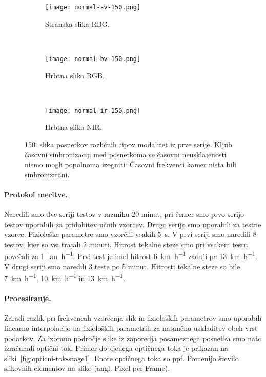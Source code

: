 \begin{figure}[htb]
	\centering
	\begin{subfigure}[t]{0.3\columnwidth}
		\centering
		\texttt{[image: normal-sv-150.png]}
		\caption{Stranska slika RBG.}
	\end{subfigure}
	~
	\begin{subfigure}[t]{0.3\columnwidth}
		\centering
		\texttt{[image: normal-bv-150.png]}
		\caption{Hrbtna slika RGB.}
	\end{subfigure}
	~
    \begin{subfigure}[t]{0.3\columnwidth}
    	\centering
		\texttt{[image: normal-ir-150.png]}
		\caption{Hrbtna slika NIR.}
	\end{subfigure}
	\caption[150. slika posnetkov različnih tipov modalitet iz prve serije]{150. slika posnetkov različnih tipov modalitet iz prve serije. Kljub časovni sinhronizaciji med posnetkoma se časovni neusklajenosti nismo mogli popolnoma izogniti. Časovni frekvenci kamer nista bili sinhronizirani.}
	\label{fig:primer-posnetka-rgb-ir}
\end{figure}


\paragraph{Protokol meritve.}
Naredili smo dve seriji testov v razmiku 20 minut, pri čemer smo prvo serijo testov uporabili za pridobitev učnih vzorcev. Drugo serijo smo uporabili za testne vzorce. Fiziološke parametre smo vzorčili vsakih \SI{5}{\s}. V prvi seriji smo naredili 8 testov, kjer so vsi trajali 2 minuti. Hitrost tekalne steze smo pri vsakem testu povečali za \SI{1}{\km\per\hour}. Prvi test je imel hitrost  \SI{6}{\km\per\hour} zadnji pa \SI{13}{\km\per\hour}. V drugi seriji smo naredili 3 teste po 5 minut. Hitrosti tekalne steze so bile  \SI{7}{\km\per\hour}, \SI{10}{\km\per\hour} in \SI{13}{\km\per\hour}.

\paragraph{Procesiranje.}\label{sec:elementarni-postopek}
Zaradi razlik pri frekvencah vzorčenja slik in fizioloških parametrov smo uporabili linearno interpolacijo na fizioloških parametrih za natančno uskladitev obeh vrst podatkov. Za izbrano področje slike iz zaporedja posameznega posnetka smo nato izračunali optični tok. Primer dobljenega optičnega toka je prikazan na sliki~\ref{fig:opticni-tok-stage1}. Enote optičnega toka so \si{ppf}. Pomenijo število slikovnih elementov na sliko (angl. Pixel per Frame).


